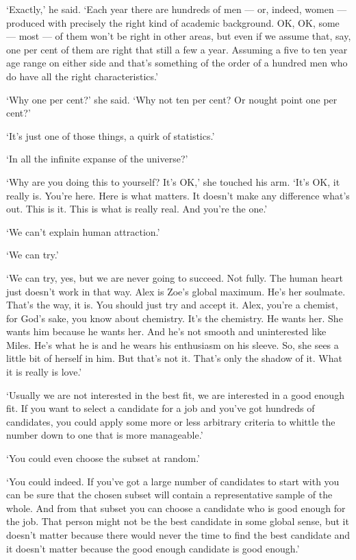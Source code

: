 `Exactly,' he said. `Each year there are hundreds of men --- or, indeed, women --- produced with precisely the right kind of academic background. OK, OK, some --- most --- of them won't be right in other areas, but even if we assume that, say, one per cent of them {\twelveit are\/} right that still a few a year. Assuming a five to ten year age range on either side and that's something of the order of a hundred men who do have all the right characteristics.'

`Why one per cent?' she said. `Why not ten per cent? Or nought point one per cent?'

`It's just one of those things, a quirk of statistics.'

`In all the infinite expanse of the universe?'

`Why are you doing this to yourself? It's OK,' she touched his arm.
`It's OK, it really is. You're here. Here is what matters. It
doesn't make any difference what's out. This is it. This is what is
really real. And you're the one.'

`We can't explain human attraction.'

`We can try.'

`We can try, yes, but we are never going to succeed. Not fully. The
human heart just doesn't work in that way. Alex is Zoe's global
maximum. He's her soulmate. That's the way, it is. You should just
try and accept it. Alex, you're a chemist, for God's sake, you know
about chemistry. It's the chemistry. He wants her. She wants him
because he wants her. And he's not smooth and uninterested like
Miles. He's what he is and he wears his enthusiasm on his sleeve.
So, she sees a little bit of herself in him. But that's not it.
That's only the shadow of it. What it is really is {\twelveit
love\/}.'

`Usually we are not interested in the best fit, we are interested in a good enough fit. If you want to select a candidate for a job and you've got hundreds of candidates, you could apply some more or less arbitrary criteria to whittle the number down to one that is more manageable.'

`You could even choose the subset at random.'

`You could indeed. If you've got a large number of candidates to start with you can be sure that the chosen subset will contain a representative sample of the whole. And from that subset you can choose a candidate who is good enough for the job. That person might not be the {\twelveit best\/} candidate in some global sense, but it doesn't matter because there would never the time to find the best candidate and it doesn't matter because the good enough candidate is good enough.'


